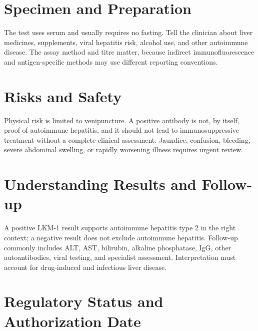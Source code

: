 \section*{Specimen and Preparation}
The test uses serum and usually requires no fasting. Tell the clinician about liver medicines, supplements, viral hepatitis risk, alcohol use, and other autoimmune disease. The assay method and titre matter, because indirect immunofluorescence and antigen-specific methods may use different reporting conventions.

\section*{Risks and Safety}
Physical risk is limited to venipuncture. A positive antibody is not, by itself, proof of autoimmune hepatitis, and it should not lead to immunosuppressive treatment without a complete clinical assessment. Jaundice, confusion, bleeding, severe abdominal swelling, or rapidly worsening illness requires urgent review.

\section*{Understanding Results and Follow-up}
A positive LKM-1 result supports autoimmune hepatitis type 2 in the right context; a negative result does not exclude autoimmune hepatitis. Follow-up commonly includes ALT, AST, bilirubin, alkaline phosphatase, IgG, other autoantibodies, viral testing, and specialist assessment. Interpretation must account for drug-induced and infectious liver disease.

\section*{Regulatory Status and Authorization Date}

\clearpage
